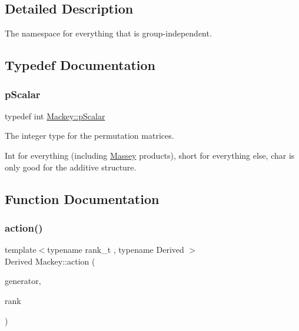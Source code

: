 \subsection{Detailed Description}
The namespace for everything that is group-\/independent. 

\subsection{Typedef Documentation}
\mbox{\label{namespaceMackey_a4f147e328c520f568f5d3adf1c75f514}} 
\subsubsection{\texorpdfstring{p\+Scalar}{pScalar}}
{\footnotesize\ttfamily typedef int \hyperlink{namespaceMackey_a4f147e328c520f568f5d3adf1c75f514}{Mackey\+::p\+Scalar}}

The integer type for the permutation matrices.

Int for everything (including \hyperlink{classMackey_1_1Massey}{Massey} products), short for everything else, char is only good for the additive structure. 

\subsection{Function Documentation}
\mbox{\label{namespaceMackey_aa515b26c0fbc7f19b36cee7d826f07b9}} 
\subsubsection{\texorpdfstring{action()}{action()}\hspace{0.1cm}{\footnotesize\ttfamily [1/2]}}
{\footnotesize\ttfamily template$<$typename rank\+\_\+t , typename Derived $>$ \\
Derived Mackey\+::action (\begin{DoxyParamCaption}\item[{const Eigen\+::\+Matrix\+Base$<$ Derived $>$ \&}]{generator,  }\item[{const rank\+\_\+t \&}]{rank }\end{DoxyParamCaption})}



